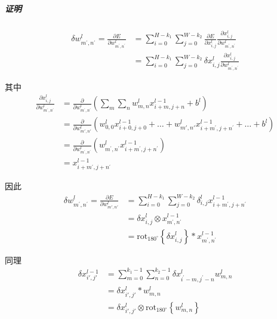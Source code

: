 \documentclass[12pt]{article}
\begin{document}
\subparagraph{证明}

\begin{align}
	\delta  w_{m^{\prime},n^{\prime}}^l = \frac{\partial E}{\partial w_{m^{\prime},n^{\prime}}^l} & = \sum_{i=0}^{H-k_1} \sum_{j=0}^{W-k_2} \frac{\partial E}{\partial x_{i,j}^{l}} \frac{\partial x_{i,j}^{l}}{\partial w_{m^{\prime},n^{\prime}}^l} \\
	                                                                                              & = \sum_{i=0}^{H-k_1} \sum_{j=0}^{W-k_2} \delta x^{l}_{i,j} \frac{\partial x_{i,j}^{l}}{\partial w_{m^{\prime},n^{\prime}}^l}
\end{align}

其中\begin{align}
	\frac{\partial x_{i,j}^{l}}{\partial w_{m^{\prime},n^{\prime}}^l} & = \frac{\partial}{\partial w_{m^{\prime},n^{\prime}}^l}\left( \sum_{m} \sum_{n} w_{m,n}^{l}x_{i+m, j+n}^{l-1} + b^l \right)                                              \\
	                                                                  & = \frac{\partial}{\partial w_{m',n'}^l}\left( w_{0,0}^{l} x_{ i + 0, j + 0}^{l-1} + \dots + w_{m',n'}^{l} x_{ i + m^{\prime}, j + n^{\prime}}^{l-1} + \dots + b^l\right) \\
	                                                                  & = \frac{\partial}{\partial w_{m^{\prime},n^{\prime}}^l}\left( w_{m^{\prime},n^{\prime}}^{l} x_{ i + m^{\prime}, j + n^{\prime}}^{l-1}\right)                             \\
	                                                                  & =  x_{i+m^{\prime},j+n^{\prime}}^{l-1}
\end{align}

因此\begin{align}
	\delta  w_{m^{\prime},n^{\prime}}^l = \frac{\partial E}{\partial w_{m',n'}^l} & = \sum_{i=0}^{H-k_1} \sum_{j=0}^{W-k_2} \delta^{l}_{i,j} x_{ i + m^{\prime}, j + n^{\prime}}^{l-1} \\
	                                                                              & = \delta x^{l}_{i,j} \otimes x_{m^{\prime},n^{\prime}}^{l-1}                                       \\
	                                                                              & = \text{rot}_{180^\circ} \left\{ \delta x^{l}_{i,j} \right\} \ast  x_{m^{\prime},n^{\prime}}^{l-1}
\end{align}

同理\begin{align}
	\delta x_{i',j'}^{l-1} & = \sum_{m = 0}^{k_1 - 1} \sum_{n = 0}^{k_2 - 1} \delta x^{l}_{i^{\prime} - m,j^{\prime} - n} w_{m,n}^{l} \\
	                       & =  \delta x^{l}_{i',j'}*   w_{m,n}^{l}                                                                   \\
	                       & = \delta x^{l}_{i',j'} \otimes \text{rot}_{180^\circ} \left\{ w_{m,n}^{l} \right\}
\end{align}
\end{document}
